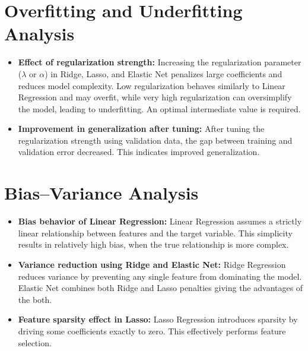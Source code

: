 \documentclass[11pt]{article}
\begin{document}
\section*{Overfitting and Underfitting Analysis}

\begin{itemize}
    

    \item \textbf{Effect of regularization strength:}  
    Increasing the regularization parameter ($\lambda$ or $\alpha$) in Ridge, Lasso, and Elastic Net penalizes large coefficients and reduces model complexity. Low regularization behaves similarly to Linear Regression and may overfit, while very high regularization can oversimplify the model, leading to underfitting. An optimal intermediate value is required.
    
    \item \textbf{Improvement in generalization after tuning:}  
    After tuning the regularization strength using validation data, the gap between training and validation error decreased. This indicates improved generalization.
\end{itemize}

\section*{Bias--Variance Analysis}

\begin{itemize}
    \item \textbf{Bias behavior of Linear Regression:}  
    Linear Regression assumes a strictly linear relationship between features and the target variable. This simplicity results in relatively high bias, when the true relationship is more complex.

    \item \textbf{Variance reduction using Ridge and Elastic Net:}  
    Ridge Regression reduces variance by preventing any single feature from dominating the model. Elastic Net combines both Ridge and Lasso penalties giving the advantages of the both.

    \item \textbf{Feature sparsity effect in Lasso:}  
    Lasso Regression introduces sparsity by driving some coefficients exactly to zero. This effectively performs feature selection.
\end{itemize}
\end{document}

